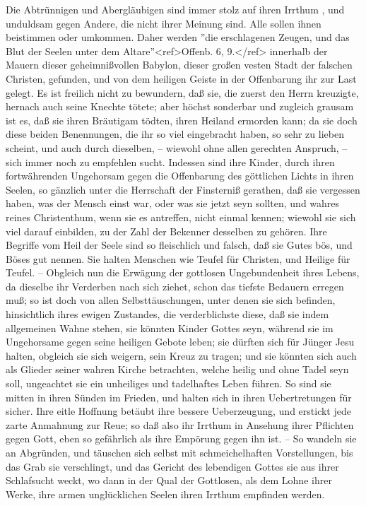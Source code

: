 Die Abtrünnigen und Abergläubigen sind immer stolz auf ihren Irrthum , und unduldsam gegen Andere, die nicht ihrer Meinung sind. Alle sollen ihnen beistimmen oder umkommen. Daher werden ''die erschlagenen Zeugen, und das Blut der Seelen unter dem Altare''<ref>Offenb. 6, 9.</ref> innerhalb der Mauern dieser geheimnißvollen Babylon, dieser großen vesten Stadt der falschen Christen, gefunden, und von dem heiligen Geiste in der Offenbarung ihr zur Last gelegt. Es ist freilich nicht zu bewundern, daß sie, die zuerst den Herrn kreuzigte, hernach auch seine Knechte tötete; aber höchst sonderbar und zugleich grausam ist es, daß sie ihren Bräutigam tödten, ihren Heiland ermorden kann; da sie doch diese beiden Benennungen, die ihr so viel eingebracht haben, so sehr zu lieben scheint, und auch durch dieselben, – wiewohl ohne allen gerechten Anspruch, – sich immer noch zu empfehlen sucht. Indessen sind ihre Kinder, durch ihren fortwährenden Ungehorsam gegen die Offenbarung des göttlichen Lichts in ihren Seelen, so gänzlich unter die Herrschaft der Finsterniß gerathen, daß sie vergessen haben, was der Mensch einst war, oder was sie jetzt seyn sollten, und wahres reines Christenthum, wenn sie es antreffen, nicht einmal kennen; wiewohl sie sich viel darauf einbilden, zu der Zahl der Bekenner desselben zu gehören. Ihre Begriffe vom Heil der Seele sind so fleischlich und falsch, daß sie Gutes bös, und Böses gut nennen. Sie halten Menschen wie Teufel für Christen, und Heilige für Teufel. – Obgleich nun die Erwägung der gottlosen Ungebundenheit ihres Lebens, da dieselbe ihr Verderben nach sich ziehet, schon das tiefste Bedauern erregen muß; so ist doch von allen Selbsttäuschungen, unter denen sie sich befinden, hinsichtlich ihres ewigen Zustandes, die verderblichste diese, daß sie indem allgemeinen Wahne stehen, sie könnten Kinder Gottes seyn, während sie im Ungehorsame gegen seine heiligen Gebote leben; sie dürften sich für Jünger Jesu halten, obgleich sie sich weigern, sein Kreuz zu tragen; und sie könnten sich auch als Glieder seiner wahren Kirche betrachten, welche heilig und ohne Tadel seyn soll, ungeachtet sie ein unheiliges und tadelhaftes Leben führen. So sind sie mitten in ihren Sünden im Frieden, und halten sich in ihren Uebertretungen für sicher. Ihre eitle Hoffnung betäubt ihre bessere Ueberzeugung, und erstickt jede zarte Anmahnung zur Reue; so daß also ihr Irrthum in Ansehung ihrer Pflichten gegen Gott, eben so gefährlich als ihre Empörung gegen ihn ist. – So wandeln sie an Abgründen, und täuschen sich selbst mit schmeichelhaften Vorstellungen, bis das Grab sie verschlingt, und das Gericht des lebendigen Gottes sie aus ihrer Schlafsucht weckt, wo dann in der Qual der Gottlosen, als dem Lohne ihrer Werke, ihre armen unglücklichen Seelen ihren Irrthum empfinden werden. 

